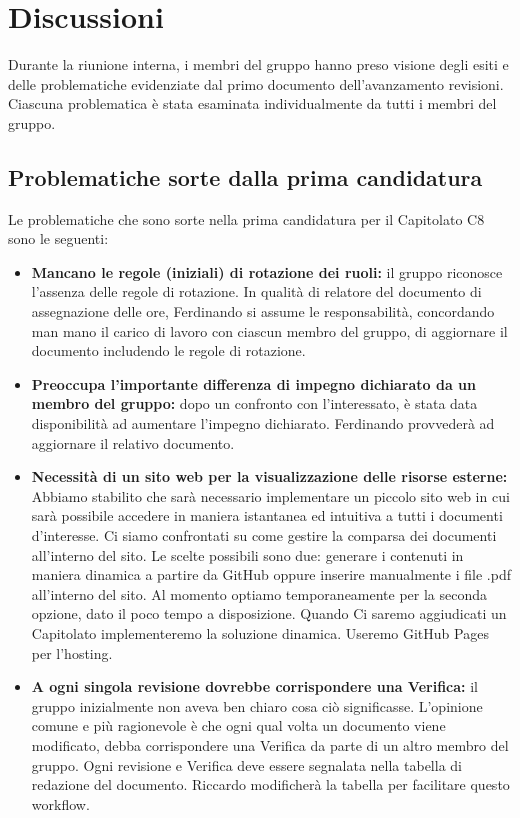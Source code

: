 \documentclass[a4paper,12pt]{article}
\begin{document}
\section{Discussioni}
Durante la riunione interna, i membri del gruppo hanno preso visione degli esiti e delle problematiche evidenziate dal primo documento dell'avanzamento revisioni. Ciascuna problematica è stata esaminata individualmente da tutti i membri del gruppo.

\subsection{Problematiche sorte dalla prima candidatura}
Le problematiche che sono sorte nella prima candidatura per il Capitolato C8 sono le seguenti:
\begin{itemize}
    \item \textbf{Mancano le regole (iniziali) di rotazione dei ruoli:} il gruppo riconosce l'assenza delle regole di rotazione. In qualità di relatore del documento di assegnazione delle ore, Ferdinando si assume le responsabilità, concordando man mano il carico di lavoro con ciascun membro del gruppo, di aggiornare il documento includendo le regole di rotazione.
    \item \textbf{Preoccupa l'importante differenza di impegno dichiarato da un membro del gruppo:} dopo un confronto con l'interessato, è stata data disponibilità ad aumentare l'impegno dichiarato. Ferdinando provvederà ad aggiornare il relativo documento. 
    \item \textbf{Necessità di un sito web per la visualizzazione delle risorse esterne:} Abbiamo stabilito che sarà necessario implementare un piccolo sito web in cui sarà possibile accedere in maniera istantanea ed intuitiva a tutti i documenti d'interesse. Ci siamo confrontati su come gestire la comparsa dei documenti all'interno del sito. Le scelte possibili sono due: generare i contenuti in maniera dinamica a partire da GitHub oppure inserire manualmente i file .pdf all'interno del sito. Al momento optiamo temporaneamente per la seconda opzione, dato il poco tempo a disposizione. Quando Ci saremo aggiudicati un Capitolato implementeremo la soluzione dinamica. Useremo GitHub Pages per l'hosting.  
    \item \textbf{A ogni singola revisione dovrebbe corrispondere una Verifica:} il gruppo inizialmente non aveva ben chiaro cosa ciò significasse. L'opinione comune e più ragionevole è che ogni qual volta un documento viene modificato, debba corrispondere una Verifica da parte di un altro membro del gruppo. Ogni revisione e Verifica deve essere segnalata nella tabella di redazione del documento. Riccardo modificherà la tabella per facilitare questo workflow.

\end{itemize}
\end{document}
